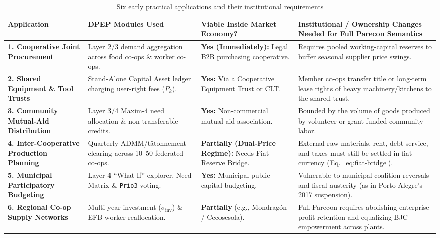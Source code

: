 \documentclass[10pt,twoside,openany]{book}
\theoremstyle{dpepstyle}
\begin{document}
\begin{table}[htbp]
\centering
\caption{Six early practical applications and their institutional requirements}
\label{tab:coop-apps}
\scriptsize
\setlength{\tabcolsep}{3.5pt}
\begin{tabularx}{\textwidth}{L{1.15in} L{1.35in} L{1.05in} Y}
\toprule
\textbf{Application} & \textbf{DPEP Modules Used} & \textbf{Viable Inside Market Economy?} & \textbf{Institutional / Ownership Changes Needed for Full Parecon Semantics} \\
\midrule
\textbf{1. Cooperative Joint Procurement} & Layer 2/3 demand aggregation across food co-ops \& worker co-ops. & \textbf{Yes (Immediately):} Legal B2B purchasing cooperative. & Requires pooled working-capital reserves to buffer seasonal supplier price swings. \\
\addlinespace[3pt]
\textbf{2. Shared Equipment \& Tool Trusts} & Stand-Alone Capital Asset ledger charging user-right fees ($P_k$). & \textbf{Yes:} Via a Cooperative Equipment Trust or CLT. & Member co-ops transfer title or long-term lease rights of heavy machinery/kitchens to the shared trust. \\
\addlinespace[3pt]
\textbf{3. Community Mutual-Aid Distribution} & Layer 3/4 Maxim-4 need allocation \& non-transferable credits. & \textbf{Yes:} Non-commercial mutual-aid association. & Bounded by the volume of goods produced by volunteer or grant-funded community labor. \\
\addlinespace[3pt]
\textbf{4. Inter-Cooperative Production Planning} & Quarterly ADMM/t\^atonnement clearing across 10--50 federated co-ops. & \textbf{Partially (Dual-Price Regime):} Needs Fiat Reserve Bridge. & External raw materials, rent, debt service, and taxes must still be settled in fiat currency (Eq.~\ref{eq:fiat-bridge}). \\
\addlinespace[3pt]
\textbf{5. Municipal Participatory Budgeting} & Layer 4 ``What-If'' explorer, Need Matrix \& \texttt{Prio3} voting. & \textbf{Yes:} Municipal public capital budgeting. & Vulnerable to municipal coalition reversals and fiscal austerity (as in Porto Alegre's 2017 suspension). \\
\addlinespace[3pt]
\textbf{6. Regional Co-op Supply Networks} & Multi-year investment ($\sigma_{\text{inv}}$) \& EFB worker reallocation. & \textbf{Partially} (e.g., Mondrag\'on / Cecosesola). & Full Parecon requires abolishing enterprise profit retention and equalizing BJC empowerment across plants. \\
\bottomrule
\end{tabularx}
\end{table}
\end{document}
